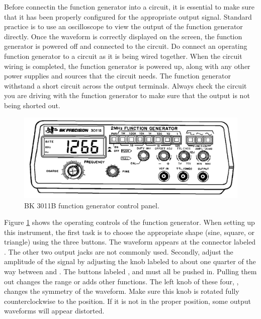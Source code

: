 \noindent Before connectin the function generator into a circuit, it is essential to make sure that it has been properly configured for the appropriate output signal. Standard practice is to use an oscilloscope to view the output of the function generator directly. Once the waveform is correctly displayed on the screen, the function generator is powered off and connected to the circuit. Do  connect an operating function generator to a circuit as it is being wired together. When the circuit wiring is completed, the function generator is powered up, along with any other power supplies and sources that the circuit needs. The function generator  withstand a short circuit across the output terminals. Always check the circuit you are driving with the function generator to make sure that the output is not being shorted out.

\begin{figure}[H]
    \centering
    \includegraphics[scale = 0.8]{Images/ACDC5.PNG}
    \caption{BK 3011B function generator control panel.}
    \label{fig:ACDC5}
\end{figure}

Figure \ref{fig:ACDC5} shows the operating controls of the function generator. When setting up this instrument, the first task is to choose the appropriate shape (sine, square, or triangle) using the three  buttons. The waveform appears at the connector labeled . The other two output jacks are not commonly used. Secondly, adjust the amplitude of the signal by adjusting the knob labeled  to about one quarter of the way between  and . The buttons labeled , and  must all be pushed in. Pulling them out changes the range or adds other functions. The left knob of these four, , changes the symmetry of the waveform. Make sure this knob is rotated fully counterclockwise to the  position. If it is not in the proper position, some output waveforms will appear distorted.

